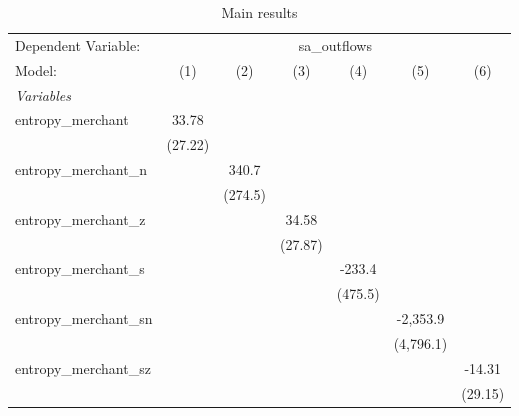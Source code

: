 
\begin{table}[htbp]
   \centering
   \footnotesize
   \begin{threeparttable}[b]
      \caption{\label{tab:reg_sa_outflows_merchant.tex} Main results}
      \begin{tabular}{lcccccc}
         \tabularnewline \midrule \midrule
         Dependent Variable: & \multicolumn{6}{c}{sa\_outflows}\\
         Model:                  & (1)           & (2)           & (3)           & (4)           & (5)           & (6)\\  
         \midrule
         \emph{Variables}\\
         entropy\_merchant       & 33.78         &               &               &               &               &   \\   
                                 & (27.22)       &               &               &               &               &   \\   
         entropy\_merchant\_n    &               & 340.7         &               &               &               &   \\   
                                 &               & (274.5)       &               &               &               &   \\   
         entropy\_merchant\_z    &               &               & 34.58         &               &               &   \\   
                                 &               &               & (27.87)       &               &               &   \\   
         entropy\_merchant\_s    &               &               &               & -233.4        &               &   \\   
                                 &               &               &               & (475.5)       &               &   \\   
         entropy\_merchant\_sn   &               &               &               &               & -2,353.9      &   \\   
                                 &               &               &               &               & (4,796.1)     &   \\   
         entropy\_merchant\_sz   &               &               &               &               &               & -14.31\\   
                                 &               &               &               &               &               & (29.15)\\   

\end{tabular}
\end{threeparttable}
\end{table}
